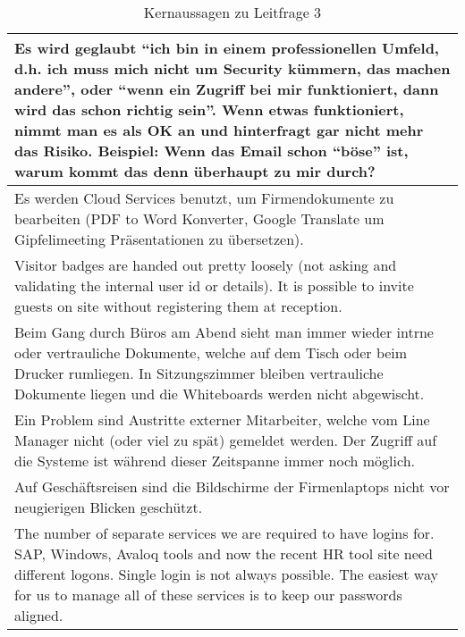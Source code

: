 \documentclass[../../main.tex]{subfiles}
\begin{document}
\begin{table}[H]
\tablefontsize	
\caption{Kernaussagen zu Leitfrage 3}
\label{kernaussagen_leitfrage3}


\begin{tabular}{ |p{\textwidth-1cm}| }



\hline
Es wird geglaubt "`ich bin in einem professionellen Umfeld, d.h. ich muss mich nicht um Security kümmern, das machen andere"', oder "`wenn ein Zugriff bei mir funktioniert, dann wird das schon richtig sein"'. Wenn etwas funktioniert, nimmt man es als OK an und hinterfragt gar nicht mehr das Risiko. Beispiel: Wenn das Email schon "`böse"' ist, warum kommt das denn überhaupt zu mir durch?\\ 
\hline
Es werden Cloud Services benutzt, um Firmendokumente zu bearbeiten (PDF to Word Konverter, Google Translate um Gipfelimeeting Präsentationen zu übersetzen).
\\
\hline
Visitor badges are handed out pretty loosely (not asking and validating the internal user id or details). It is possible to invite guests on site without registering them at reception. \\ 
\hline
Beim Gang durch Büros am Abend sieht man immer wieder intrne oder vertrauliche Dokumente, welche auf dem Tisch oder beim Drucker rumliegen. In Sitzungszimmer bleiben vertrauliche Dokumente liegen und die Whiteboards werden nicht abgewischt. \\ 
\hline
Ein Problem sind Austritte externer Mitarbeiter, welche vom Line Manager nicht (oder viel zu spät) gemeldet werden. Der Zugriff auf die Systeme ist während dieser Zeitspanne immer noch möglich.\\ 
\hline
Auf Geschäftsreisen sind die Bildschirme der Firmenlaptops nicht vor neugierigen Blicken geschützt. \\ 
\hline
The number of separate services we are required to have logins for. SAP, Windows, Avaloq tools and now the recent HR tool site need different logons. Single login is not always possible. The easiest way for us to manage all of these services is to keep our passwords aligned. \\ 
\hline

\end{tabular}
\end{table}
\end{document}
